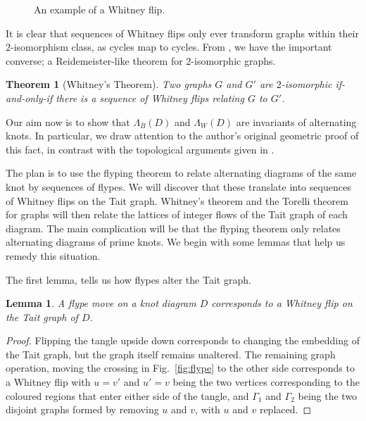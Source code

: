 \documentclass[12pt]{report}
\newtheorem*{theorem}{Theorem}
\newtheorem*{lemma}{Lemma}
\begin{document}
\begin{figure}[hbt!]
	\centering
	\def\svgscale{0.5}
	
	
	\caption{An example of a Whitney flip.}
	\label{fig:whitney_flip}
\end{figure}

It is clear that sequences of Whitney flips only ever transform graphs within their $2$-isomorphism class, as cycles map to cycles. From \cite{2-isomorphic-graphs}, we have the important converse; a Reidemeister-like theorem for $2$-isomorphic graphs.

\begin{theorem}[Whitney's Theorem]
Two graphs $G$ and $G'$ are $2$-isomorphic if-and-only-if there is a sequence of Whitney flips relating $G$ to $G'$.
\end{theorem}

Our aim now is to show that $\Lambda_{B}(D)$ and $\Lambda_{W}(D)$ are invariants of alternating knots.  In particular, we draw attention to the author's original geometric proof of this fact, in contrast with the topological arguments given in \cite{lattices-graphs-mutation}.

The plan is to use the flyping theorem to relate alternating diagrams of the same knot by sequences of flypes.  We will discover that these translate into sequences of Whitney flips on the Tait graph. Whitney's theorem and the Torelli theorem for graphs will then relate the lattices of integer flows of the Tait graph of each diagram. The main complication will be that the flyping theorem only relates alternating diagrams of prime knots. We begin with some lemmas that help us remedy this situation.

The first lemma, tells us how flypes alter the Tait graph.

\begin{lemma}
	A flype move on a knot diagram $D$ corresponds to a Whitney flip on the Tait graph of $D$.
\end{lemma}

\begin{proof}
	Flipping the tangle upside down corresponds to changing the embedding of the Tait graph, but the graph itself remains unaltered. The remaining graph operation, moving the crossing in Fig.~\ref{fig:flype} to the other side corresponds to a Whitney flip with $u = v'$ and $u' = v$ being the two vertices corresponding to the coloured regions that enter either side of the tangle, and $\Gamma_{1}$ and $\Gamma_{2}$ being the two disjoint graphs formed by removing $u$ and $v$, with $u$ and $v$ replaced.
\end{proof}
\end{document}

